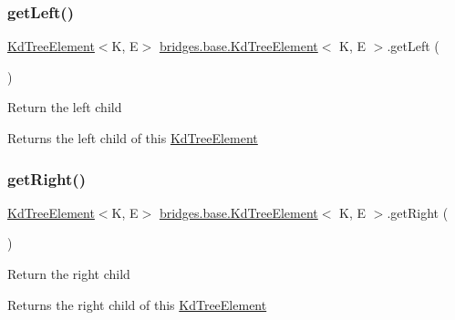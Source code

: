 \subsubsection{\texorpdfstring{get\+Left()}{getLeft()}}
{\footnotesize\ttfamily \mbox{\hyperlink{classbridges_1_1base_1_1_kd_tree_element}{Kd\+Tree\+Element}}$<$K, E$>$ \mbox{\hyperlink{classbridges_1_1base_1_1_kd_tree_element}{bridges.\+base.\+Kd\+Tree\+Element}}$<$ K, E $>$.get\+Left (\begin{DoxyParamCaption}{ }\end{DoxyParamCaption})}

Return the left child

\begin{DoxyReturn}{Returns}
the left child of this \mbox{\hyperlink{classbridges_1_1base_1_1_kd_tree_element}{Kd\+Tree\+Element}} 
\end{DoxyReturn}
\mbox{\label{classbridges_1_1base_1_1_kd_tree_element_a990694a36d44aba5f844f1752692c8e6}} 
\subsubsection{\texorpdfstring{get\+Right()}{getRight()}}
{\footnotesize\ttfamily \mbox{\hyperlink{classbridges_1_1base_1_1_kd_tree_element}{Kd\+Tree\+Element}}$<$K, E$>$ \mbox{\hyperlink{classbridges_1_1base_1_1_kd_tree_element}{bridges.\+base.\+Kd\+Tree\+Element}}$<$ K, E $>$.get\+Right (\begin{DoxyParamCaption}{ }\end{DoxyParamCaption})}

Return the right child

\begin{DoxyReturn}{Returns}
the right child of this \mbox{\hyperlink{classbridges_1_1base_1_1_kd_tree_element}{Kd\+Tree\+Element}} 
\end{DoxyReturn}
\mbox{\label{classbridges_1_1base_1_1_kd_tree_element_a27c0b086af284210855ee5f1c90e7484}} 
